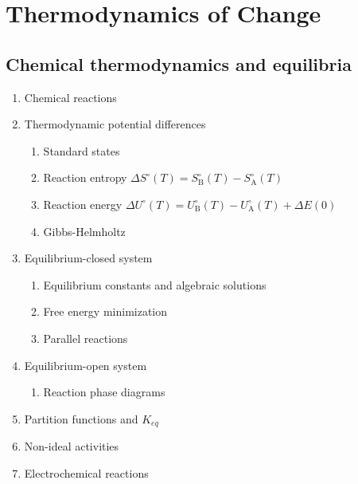 \documentclass[11pt]{article}
\begin{document}
\section{Thermodynamics of Change}
\label{sec:orgf0a9cec}
\subsection{Chemical thermodynamics and equilibria}
\label{sec:orga16876d}
\begin{enumerate}
\item Chemical reactions
\item Thermodynamic potential differences
\begin{enumerate}
\item Standard states
\item Reaction entropy \(\Delta S^\circ (T) =  S^\circ_\mathrm{B}(T)-S^\circ_\mathrm{A}(T)\)
\item Reaction energy \(\Delta U^\circ (T) = U^\circ_\mathrm{B}(T)-U^\circ_\mathrm{A}(T)+\Delta E(0)\)
\item Gibbs-Helmholtz
\end{enumerate}
\item Equilibrium-closed system
\begin{enumerate}
\item Equilibrium constants and algebraic solutions
\item Free energy minimization
\item Parallel reactions
\end{enumerate}
\item Equilibrium-open system
\begin{enumerate}
\item Reaction phase diagrams
\end{enumerate}
\item Partition functions and \(K_{eq}\)
\item Non-ideal activities
\item Electrochemical reactions
\end{enumerate}
\end{document}
